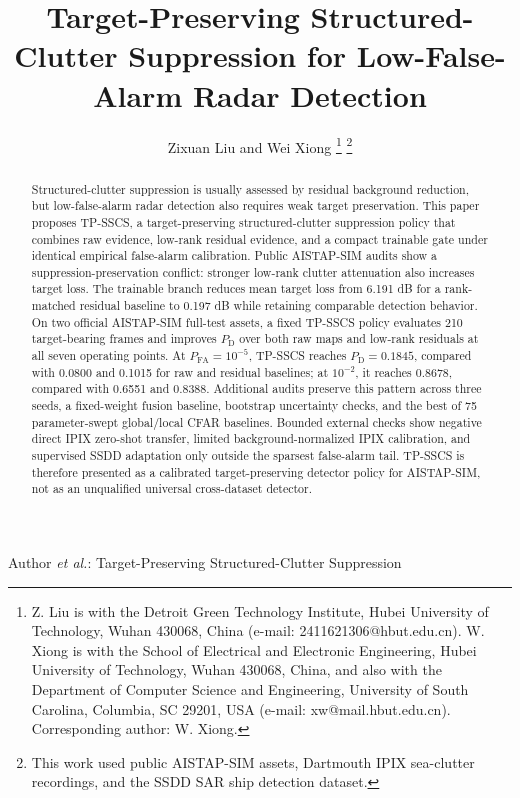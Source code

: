 \documentclass[journal]{IEEEtran}
\begin{document}
\title{Target-Preserving Structured-Clutter Suppression for Low-False-Alarm Radar Detection}

\author{Zixuan Liu and Wei Xiong%
\thanks{Z. Liu is with the Detroit Green Technology Institute, Hubei University of Technology, Wuhan 430068, China (e-mail: 2411621306@hbut.edu.cn). W. Xiong is with the School of Electrical and Electronic Engineering, Hubei University of Technology, Wuhan 430068, China, and also with the Department of Computer Science and Engineering, University of South Carolina, Columbia, SC 29201, USA (e-mail: xw@mail.hbut.edu.cn). Corresponding author: W. Xiong.}%
\thanks{This work used public AISTAP-SIM assets, Dartmouth IPIX sea-clutter recordings, and the SSDD SAR ship detection dataset.}}

%
{Author \MakeLowercase{\textit{et al.}}: Target-Preserving Structured-Clutter Suppression}

\maketitle

\begin{abstract}
Structured-clutter suppression is usually assessed by residual background reduction, but low-false-alarm radar detection also requires weak target preservation. This paper proposes TP-SSCS, a target-preserving structured-clutter suppression policy that combines raw evidence, low-rank residual evidence, and a compact trainable gate under identical empirical false-alarm calibration. Public AISTAP-SIM audits show a suppression-preservation conflict: stronger low-rank clutter attenuation also increases target loss. The trainable branch reduces mean target loss from 6.191 dB for a rank-matched residual baseline to 0.197 dB while retaining comparable detection behavior. On two official AISTAP-SIM full-test assets, a fixed TP-SSCS policy evaluates 210 target-bearing frames and improves $P_{\mathrm{D}}$ over both raw maps and low-rank residuals at all seven operating points. At $P_{\mathrm{FA}}=10^{-5}$, TP-SSCS reaches $P_{\mathrm{D}}=0.1845$, compared with 0.0800 and 0.1015 for raw and residual baselines; at $10^{-2}$, it reaches 0.8678, compared with 0.6551 and 0.8388. Additional audits preserve this pattern across three seeds, a fixed-weight fusion baseline, bootstrap uncertainty checks, and the best of 75 parameter-swept global/local CFAR baselines. Bounded external checks show negative direct IPIX zero-shot transfer, limited background-normalized IPIX calibration, and supervised SSDD adaptation only outside the sparsest false-alarm tail. TP-SSCS is therefore presented as a calibrated target-preserving detector policy for AISTAP-SIM, not as an unqualified universal cross-dataset detector.
\end{abstract}
\end{document}
